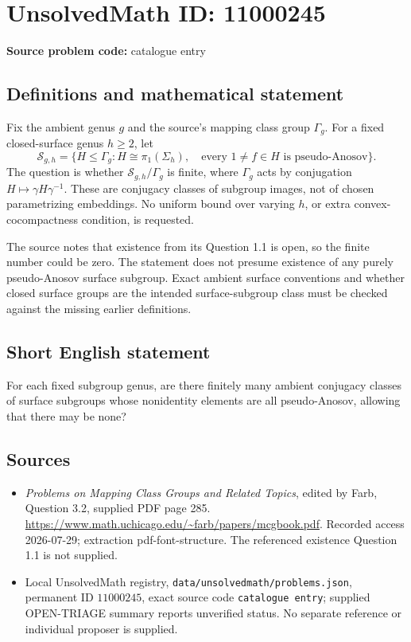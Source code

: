 \documentclass[11pt]{article}
\begin{document}
\section*{UnsolvedMath ID: 11000245}
\textbf{Source problem code:} catalogue entry
\subsection{Definitions and mathematical statement}
Fix the ambient genus \(g\) and the source's mapping class group \(\Gamma_g\). For a fixed closed-surface genus \(h\geq2\), let
\[
 \mathscr S_{g,h}=\{H\leq\Gamma_g:
 H\cong\pi_1(\Sigma_h),\quad
 \text{every }1\ne f\in H\text{ is pseudo-Anosov}\}.
\]
The question is whether \(\mathscr S_{g,h}/\Gamma_g\) is finite, where \(\Gamma_g\) acts by conjugation \(H\mapsto\gamma H\gamma^{-1}\). These are conjugacy classes of subgroup images, not of chosen parametrizing embeddings. No uniform bound over varying \(h\), or extra convex-cocompactness condition, is requested.

The source notes that existence from its Question 1.1 is open, so the finite number could be zero. The statement does not presume existence of any purely pseudo-Anosov surface subgroup. Exact ambient surface conventions and whether closed surface groups are the intended surface-subgroup class must be checked against the missing earlier definitions.
\subsection{Short English statement}
For each fixed subgroup genus, are there finitely many ambient conjugacy classes of surface subgroups whose nonidentity elements are all pseudo-Anosov, allowing that there may be none?
\subsection{Sources}
\begin{itemize}
\item \emph{Problems on Mapping Class Groups and Related Topics}, edited by Farb, Question 3.2, supplied PDF page 285. \url{https://www.math.uchicago.edu/~farb/papers/mcgbook.pdf}. Recorded access 2026-07-29; extraction pdf-font-structure. The referenced existence Question 1.1 is not supplied.
\item Local UnsolvedMath registry, \texttt{data/unsolvedmath/problems.json}, permanent ID \(11000245\), exact source code \texttt{catalogue entry}; supplied OPEN-TRIAGE summary reports unverified status. No separate reference or individual proposer is supplied.
\end{itemize}
\end{document}
